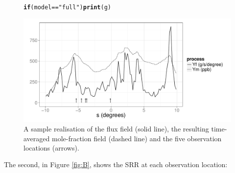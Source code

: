 \documentclass[a4paper,11pt]{article}\usepackage[]{graphicx}\usepackage[]{color}
\makeatletter
\def\maxwidth{ %
  \ifdim\Gin@nat@width>\linewidth
    \linewidth
  \else
    \Gin@nat@width
  \fi
}
\newcommand{\hlstr}[1]{\textcolor[rgb]{0.192,0.494,0.8}{#1}}%
\newcommand{\hlopt}[1]{\textcolor[rgb]{0,0,0}{#1}}%
\newcommand{\hlstd}[1]{\textcolor[rgb]{0.345,0.345,0.345}{#1}}%
\newcommand{\hlkwa}[1]{\textcolor[rgb]{0.161,0.373,0.58}{\textbf{#1}}}%
\newcommand{\hlkwd}[1]{\textcolor[rgb]{0.737,0.353,0.396}{\textbf{#1}}}%
\newenvironment{kframe}{%
 \def\at@end@of@kframe{}%
 \ifinner\ifhmode%
  \def\at@end@of@kframe{\end{minipage}}%
  \begin{minipage}{\columnwidth}%
 \fi\fi%
 \def\FrameCommand##1{\hskip\@totalleftmargin \hskip-\fboxsep
 \colorbox{shadecolor}{##1}\hskip-\fboxsep
     \hskip-\linewidth \hskip-\@totalleftmargin \hskip\columnwidth}%
 \MakeFramed {\advance\hsize-\width
   \@totalleftmargin\z@ \linewidth\hsize
   \@setminipage}}%
 {\par\unskip\endMakeFramed%
 \at@end@of@kframe}
\newenvironment{knitrout}{}{} %
\makeatother
\begin{document}
\begin{figure}
\begin{center}
\begin{knitrout}
\color{fgcolor}\begin{kframe}
\begin{alltt}
\hlkwa{if}\hlstd{(model} \hlopt{==} \hlstr{"full"}\hlstd{)} \hlkwd{print}\hlstd{(g)}
\end{alltt}
\end{kframe}
\includegraphics[width=\maxwidth]{figure/YfYm-plot-1} 

\end{knitrout}
\end{center}
\caption{A sample realisation of the flux field (solid line), the resulting time-averaged mole-fraction field (dashed line) and the five observation locations (arrows).}
\label{fig:YfYm}
\end{figure}






The second, in Figure \ref{fig:B}, shows the SRR at each observation location:
\end{document}
